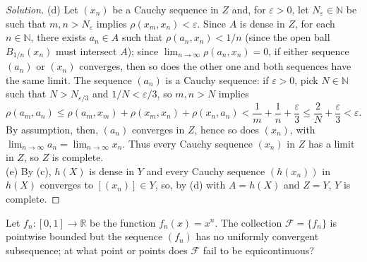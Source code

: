 \documentclass[10pt]{article}
\providecommand{\eps}{\varepsilon}
\providecommand{\NN}{\mathbb N}
\providecommand{\RR}{\mathbb R}
\newenvironment{soln}{\begin{proof}[Solution]}{\end{proof}}
\begin{document}
\begin{soln}
    (d) Let $(x_n)$ be a Cauchy sequence in $Z$
    and, for $\eps>0$, let $N_\eps\in\NN$ be such that
    $m,n>N_\eps$ implies $\rho(x_m,x_n) < \eps$.
    Since $A$ is dense in $Z$, for each $n\in\NN$, there exists
    $a_n\in A$ such that $\rho(a_n,x_n) < 1/n$
    (since the open ball $B_{1/n}(x_n)$ must intersect $A$);
    since $\lim_{n\to\infty} \rho(a_n,x_n) = 0$,
    if either sequence $(a_n)$ or $(x_n)$ converges, then so does the other one
    and both sequences have the same limit.
    The sequence $(a_n)$ is a Cauchy sequence:
    if $\eps>0$, pick $N\in\NN$ such that $N > N_{\eps/3}$ and
    $1/N < \eps/3$, so $m,n>N$ implies
    \begin{equation*}
	\rho(a_m,a_n) \le \rho(a_m,x_m) + \rho(x_m,x_n) + \rho(x_n,a_n)
	< \frac 1m + \frac 1n + \frac\eps3 \le \frac 2N + \frac\eps3
	< \eps.
    \end{equation*}
    By assumption, then, $(a_n)$ converges in $Z$,
    hence so does $(x_n)$, with $\lim_{n\to\infty} a_n = \lim_{n\to\infty} x_n$.
    Thus every Cauchy sequence $(x_n)$ in $Z$
    has a limit in $Z$, so $Z$ is complete.
    \\

    (e) By (c), $h(X)$ is dense in $Y$
    and every Cauchy sequence $(h(x_n))$ in $h(X)$ converges to $[(x_n)]\in Y$,
    so, by (d) with $A = h(X)$ and $Z = Y$, $Y$ is complete.
\end{soln}

\begin{problem}
    [Munkres 45.4a]
    Let $f_n\colon[0,1]\to\RR$ be the function $f_n(x) = x^n$.
    The collection $\mathcal F = \{f_n\}$ is pointwise bounded
    but the sequence $(f_n)$ has no uniformly convergent subsequence;
    at what point or points does $\mathcal F$ fail to be equicontinuous?
\end{problem}
\end{document}
